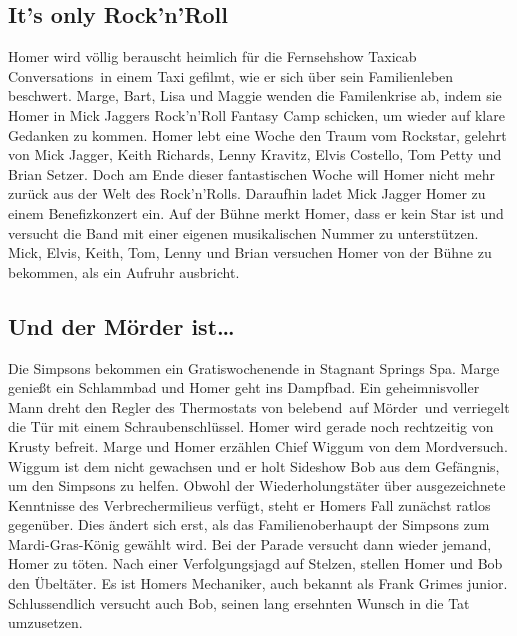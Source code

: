 \subsection{It's only Rock'n'Roll}\label{DABF22}
Homer wird völlig berauscht heimlich für die Fernsehshow \glqq Taxicab Conversations\grqq\ in einem Taxi gefilmt, wie er sich über sein Familienleben beschwert. Marge, Bart, Lisa und Maggie wenden die Familenkrise ab, indem sie Homer in Mick Jaggers Rock'n'Roll Fantasy Camp schicken, um wieder auf klare Gedanken zu kommen. Homer lebt eine Woche den Traum vom Rockstar, gelehrt von Mick Jagger, Keith Richards, Lenny Kravitz, Elvis Costello, Tom Petty und Brian Setzer. Doch am Ende dieser fantastischen Woche will Homer nicht mehr zurück aus der Welt des Rock'n'Rolls. Daraufhin ladet Mick Jagger Homer zu einem Benefizkonzert ein. Auf der Bühne merkt Homer, dass er kein Star ist und versucht die Band mit einer eigenen musikalischen Nummer zu unterstützen. Mick, Elvis, Keith, Tom, Lenny und Brian versuchen Homer von der Bühne zu bekommen, als ein Aufruhr ausbricht.


\subsection{Und der Mörder ist\dots}\label{EABF01}
Die Simpsons bekommen ein Gratiswochenende in \glqq Stagnant Springs Spa\grqq . Marge genießt ein Schlammbad und Homer geht ins Dampfbad. Ein geheimnisvoller Mann dreht den Regler des Thermostats von \glqq belebend\grqq\ auf \glqq Mörder\grqq\ und verriegelt die Tür mit einem Schraubenschlüssel. Homer wird gerade noch rechtzeitig von Krusty befreit. Marge und Homer erzählen Chief Wiggum von dem Mordversuch. Wiggum ist dem nicht gewachsen und er holt Sideshow Bob aus dem Gefängnis, um den Simpsons zu helfen. Obwohl der Wiederholungstäter über ausgezeichnete Kenntnisse des Verbrechermilieus verfügt, steht er Homers Fall zunächst ratlos gegenüber. Dies ändert sich erst, als das Familienoberhaupt der Simpsons zum Mardi-Gras-König gewählt wird. Bei der Parade versucht dann wieder jemand, Homer zu töten. Nach einer Verfolgungsjagd auf Stelzen, stellen Homer und Bob den Übeltäter. Es ist Homers Mechaniker, auch bekannt als Frank Grimes junior. Schlussendlich versucht auch Bob, seinen lang ersehnten Wunsch in die Tat umzusetzen.

